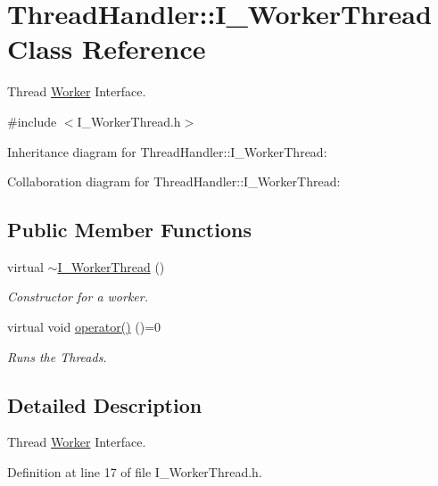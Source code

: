 \hypertarget{classThreadHandler_1_1I__WorkerThread}{}\section{Thread\+Handler\+::I\+\_\+\+Worker\+Thread Class Reference}
\label{classThreadHandler_1_1I__WorkerThread}


Thread \mbox{\hyperlink{classWorker}{Worker}} Interface.  




{\ttfamily \#include $<$I\+\_\+\+Worker\+Thread.\+h$>$}



Inheritance diagram for Thread\+Handler\+::I\+\_\+\+Worker\+Thread\+:


Collaboration diagram for Thread\+Handler\+::I\+\_\+\+Worker\+Thread\+:
\subsection*{Public Member Functions}
\begin{DoxyCompactItemize}
\item 
virtual \mbox{\hyperlink{classThreadHandler_1_1I__WorkerThread_ac2968cf7e384a733d80416ef1df37a43}{$\sim$\+I\+\_\+\+Worker\+Thread}} ()
\begin{DoxyCompactList}\small\item\em Constructor for a worker. \end{DoxyCompactList}\item 
\mbox{\label{classThreadHandler_1_1I__WorkerThread_ac3cc1cc1d0c7830b5b3a2425d55ac48d}} 
virtual void \mbox{\hyperlink{classThreadHandler_1_1I__WorkerThread_ac3cc1cc1d0c7830b5b3a2425d55ac48d}{operator()}} ()=0
\begin{DoxyCompactList}\small\item\em Runs the Threads. \end{DoxyCompactList}\end{DoxyCompactItemize}


\subsection{Detailed Description}
Thread \mbox{\hyperlink{classWorker}{Worker}} Interface. 

Definition at line 17 of file I\+\_\+\+Worker\+Thread.\+h.



